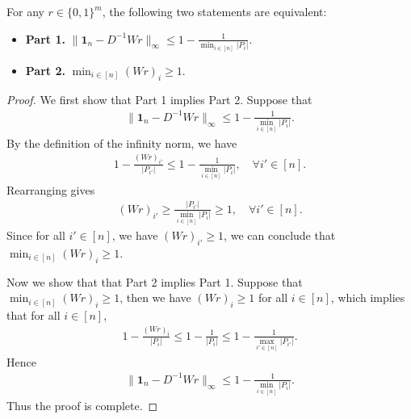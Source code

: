 \begin{lemma}\label{lem:useful_lemma}
    For any $r \in \{0,1\}^m$, the following two statements are equivalent:
    \begin{itemize}
       \item {\bf Part 1.} $\|\mathbf{1}_n - D^{-1}Wr\|_\infty \leq 1 - \frac{1}{\min_{i \in [n]}|P_i|}$.
       \item {\bf Part 2.} $\min_{i\in[n]} (Wr)_i \geq 1$.
    \end{itemize}
\end{lemma}
\begin{proof}
    We first show that Part 1 implies Part 2.
    Suppose that
    \begin{align*}
        \|\mathbf{1}_n - D^{-1}Wr\|_\infty \leq 1 - \frac{1}{\min_{i \in [n]}|P_i|}.
    \end{align*}
    By the definition of the infinity norm, we have
    \begin{align*}
         1- \frac{(Wr)_{i'}}{|P_{i'}|} \leq 1 - \frac{1}{\min_{i \in [n]}|P_i|}, \quad \forall i' \in [n].
    \end{align*}
    Rearranging gives
    \begin{align*}
        (Wr)_{i'} \geq \frac{|P_{i'}|}{\min_{i \in [n]}|P_i|} \geq 1, \quad \forall i' \in [n].
    \end{align*}
    Since for all $i'\in[n]$, we have $(Wr)_{i'} \geq 1$, we can conclude that $\min_{i\in[n]} (Wr)_i \geq 1$.

    Now we show that that Part 2 implies Part 1.
    Suppose that $\min_{i\in[n]} (Wr)_i \geq 1$,  then we have $(Wr)_{i} \geq 1$ for all $i \in [n]$, which implies that for all $i \in [n]$, 
    \begin{align*}
        1 - \frac{(Wr)_i}{|P_i|} \leq  1 - \frac{1}{|P_i|} \leq  1 - \frac{1}{\max_{i' \in [n]} |P_{i'}|}.
    \end{align*}
    Hence
    \begin{align*}
        \|\mathbf{1}_n - D^{-1}Wr\|_\infty \leq 1 - \frac{1}{\min_{i \in [n]}|P_i|}.
    \end{align*}
    Thus the proof is complete.
\end{proof}

